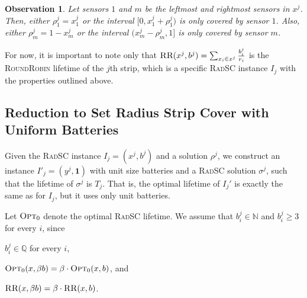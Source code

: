 \documentclass[11pt]{article}
\newtheorem{observation}[lemma]{Observation}
\newcommand{\naturals}{\mathbb{N}}
\newcommand{\rationals}{\mathbb{Q}}
\newcommand{\srsc}{\textsc{RadSC}\xspace}
\newcommand{\rr}{\textsc{RoundRobin}\xspace}
\newcommand{\RR}{\textsc{RR}\xspace}
\newcommand{\all}{\textsc{All}}
\newcommand{\opt}{\textsc{Opt}\xspace}
\begin{document}
\begin{observation}
\label{obs:annoying}
Let sensors $1$ and $m$ be the leftmost and rightmost sensors in
$x^j$.  Then, either $\rho^j_1 = x^j_1$ or the interval
$[0,x^j_1+\rho^j_1)$ is only covered by sensor $1$.  Also, either
$\rho^j_m = 1-x^j_m$ or the interval $(x^j_m-\rho^j_m,1]$ is only
covered by sensor $m$.
\end{observation}



For now, it is important to note only that $\RR(x^j,b^j) = \sum_{x_i
\in x^j} \frac{b^j_i}{r_i}$ is the \rr lifetime of the $j$th strip,
which is a specific \srsc instance $I_j$ with the properties outlined
above.


\iffalse 

\begin{proof}
The theorem now follows from the upper bound and
Lemmas~\ref{lemma:dror}, \ref{lemma:strip_all}, and
\ref{lemma:strip_split}.  Suppose to the contrary that $RR(X,B) < \frac{2}{3}
\opt(X,B)$.  Then there must exist some strip $S_i$ in which $RR(X_i, B_i) <
\frac{2}{3} \opt_i(X_i, B_i)$.  By Lemma~\ref{lemma:strip_split},
$RR'(X_i') = RR'(X_i, B_i) \leq RR(X_i, B_i)$, while $\opt_i(X_i, B_i)
\leq \all(X_i')$.  However, by Lemma~\ref{lemma:dror}, $RR'(X_i') \geq
\frac{2}{3} \all(X_i')$.  Thus, 
\[
\frac{RR(X_i, B_i)}{\opt_i(X_i, B_i)} 
\geq \frac{RR'(X_i')}{\all(X_i')} 
\geq \frac{2}{3} 
~, 
\]
a contradiction.  Finally, Lemma \ref{lemma:strip_all} implies that
$RR(X, B) \geq \frac{2}{3} \opt(X,B)$. 
\end{proof}

\fi 





\subsection{Reduction to Set Radius Strip Cover with Uniform Batteries}

Given the \srsc instance $I_j = (x^j,b^j)$ and a solution $\rho^j$, we
construct an instance $I'_j = (y^j,\mathbf{1})$ with unit size
batteries and a \srsc solution $\sigma^j$, such that the lifetime of
$\sigma^j$ is $T_j$. That is, the optimal lifetime of $I_j'$ is
exactly the same as for $I_j$, but it uses only unit batteries.

Let $\opt_0$ denote the optimal \srsc lifetime.  We assume that $b^j_i
\in \naturals$ and $b^j_i \geq 3$ for every $i$, since
\begin{inparaenum}[(i)]
\item $b^j_i \in \rationals$ for every $i$,
\item $\opt_0(x,\beta b) = \beta \cdot \opt_0(x,b)$, and
\item $\RR(x, \beta b) = \beta \cdot  \RR(x,b)$.
\end{inparaenum}
\end{document}
